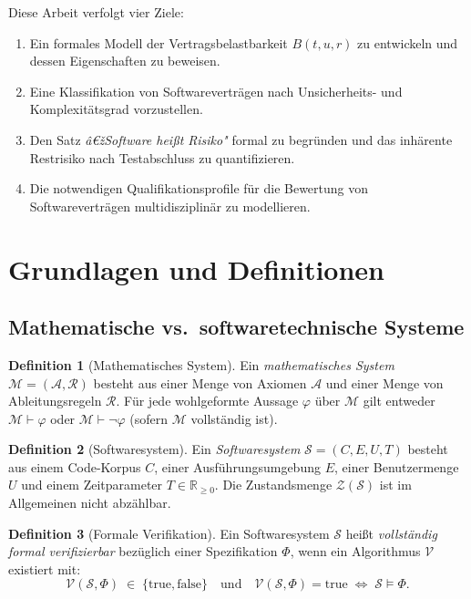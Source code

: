 ﻿\documentclass[a4paper,12pt]{article}
\theoremstyle{definition}
\newtheorem{definition}{Definition}
\begin{document}
Diese Arbeit verfolgt vier Ziele:
\begin{enumerate}
    \item Ein formales Modell der Vertragsbelastbarkeit $B(t, u, r)$ zu entwickeln und
          dessen Eigenschaften zu beweisen.
    \item Eine Klassifikation von Softwarevertr\"agen nach Unsicherheits- und
          Komplexit\"atsgrad vorzustellen.
    \item Den Satz \emph{â€žSoftware hei\ss{}t Risiko"} formal zu begr\"unden und das
          inhärente Restrisiko nach Testabschluss zu quantifizieren.
    \item Die notwendigen Qualifikationsprofile f\"ur die Bewertung von Softwarevertr\"agen
          multidisziplin\"ar zu modellieren.
\end{enumerate}

\section{Grundlagen und Definitionen}

\subsection{Mathematische vs.\ softwaretechnische Systeme}

\begin{definition}[Mathematisches System]
    Ein \emph{mathematisches System} $\mathcal{M} = (\mathcal{A}, \mathcal{R})$ besteht aus
    einer Menge von Axiomen $\mathcal{A}$ und einer Menge von Ableitungsregeln $\mathcal{R}$.
    F\"ur jede wohlgeformte Aussage $\varphi$ \"uber $\mathcal{M}$ gilt entweder
    $\mathcal{M} \vdash \varphi$ oder $\mathcal{M} \vdash \neg\varphi$ (sofern $\mathcal{M}$
    vollst\"andig ist).
\end{definition}

\begin{definition}[Softwaresystem]
    Ein \emph{Softwaresystem} $\mathcal{S} = (C, E, U, T)$ besteht aus einem Code-Korpus
    $C$, einer Ausf\"uhrungsumgebung $E$, einer Benutzermenge $U$ und einem Zeitparameter
    $T \in \mathbb{R}_{\geq 0}$. Die Zustandsmenge $\mathcal{Z}(\mathcal{S})$ ist im
    Allgemeinen nicht abz\"ahlbar.
\end{definition}

\begin{definition}[Formale Verifikation]
    Ein Softwaresystem $\mathcal{S}$ hei\ss{}t \emph{vollst\"andig formal verifizierbar}
    bez\"uglich einer Spezifikation $\Phi$, wenn ein Algorithmus $\mathcal{V}$ existiert
    mit:
    \[
        \mathcal{V}(\mathcal{S}, \Phi) \;\in\; \{\text{true}, \text{false}\}
        \quad \text{und} \quad
        \mathcal{V}(\mathcal{S}, \Phi) = \text{true} \;\Leftrightarrow\; \mathcal{S} \models \Phi.
    \]
\end{definition}
\end{document}
